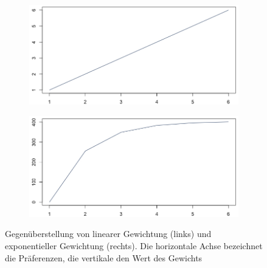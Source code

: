             \begin{figure}
                \centering
                \begin{subfigure}{0.49\textwidth}
                    \includegraphics[width=1.0\textwidth]{./algorithm/images/lin_weights.png}
                \end{subfigure}
                \begin{subfigure}{0.49\textwidth}
                    \includegraphics[width=1.0\textwidth]{./algorithm/images/expo_weights.png}
                \end{subfigure}
                \caption{Gegenüberstellung von linearer Gewichtung (links) und exponentieller Gewichtung (rechts). Die horizontale Achse bezeichnet die Präferenzen, die vertikale den Wert des Gewichts}
                \label{fig:weights}
            \end{figure}
            
        
